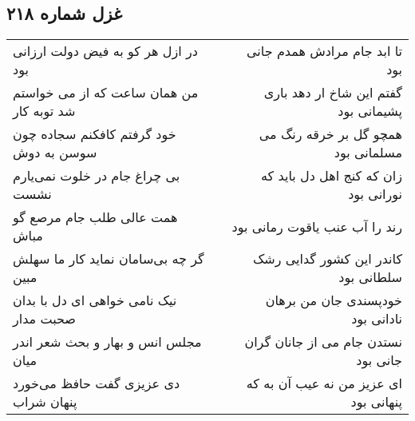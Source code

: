 \begin{center}
\section*{غزل شماره ۲۱۸}
\label{sec:sh218}
\begin{longtable}{l p{0.5cm} r}
در ازل هر کو به فیض دولت ارزانی بود
&&
تا ابد جام مرادش همدم جانی بود
\\
من همان ساعت که از می خواستم شد توبه کار
&&
گفتم این شاخ ار دهد باری پشیمانی بود
\\
خود گرفتم کافکنم سجاده چون سوسن به دوش
&&
همچو گل بر خرقه رنگ می مسلمانی بود
\\
بی چراغ جام در خلوت نمی‌یارم نشست
&&
زان که کنج اهل دل باید که نورانی بود
\\
همت عالی طلب جام مرصع گو مباش
&&
رند را آب عنب یاقوت رمانی بود
\\
گر چه بی‌سامان نماید کار ما سهلش مبین
&&
کاندر این کشور گدایی رشک سلطانی بود
\\
نیک نامی خواهی ای دل با بدان صحبت مدار
&&
خودپسندی جان من برهان نادانی بود
\\
مجلس انس و بهار و بحث شعر اندر میان
&&
نستدن جام می از جانان گران جانی بود
\\
دی عزیزی گفت حافظ می‌خورد پنهان شراب
&&
ای عزیز من نه عیب آن به که پنهانی بود
\\
\end{longtable}
\end{center}
